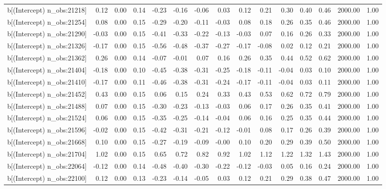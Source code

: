 \begin{table}[ht]
\begin{tabular}{rrrrrrrrrrrrrrr}
  b[(Intercept) n\_obs:21218] & 0.12 & 0.00 & 0.14 & -0.23 & -0.16 & -0.06 & 0.03 & 0.12 & 0.21 & 0.30 & 0.40 & 0.46 & 2000.00 & 1.00 \\ 
  b[(Intercept) n\_obs:21254] & 0.08 & 0.00 & 0.15 & -0.29 & -0.20 & -0.11 & -0.03 & 0.08 & 0.18 & 0.26 & 0.35 & 0.46 & 2000.00 & 1.00 \\ 
  b[(Intercept) n\_obs:21290] & -0.03 & 0.00 & 0.15 & -0.41 & -0.33 & -0.22 & -0.13 & -0.03 & 0.07 & 0.16 & 0.26 & 0.33 & 2000.00 & 1.00 \\ 
  b[(Intercept) n\_obs:21326] & -0.17 & 0.00 & 0.15 & -0.56 & -0.48 & -0.37 & -0.27 & -0.17 & -0.08 & 0.02 & 0.12 & 0.21 & 2000.00 & 1.00 \\ 
  b[(Intercept) n\_obs:21362] & 0.26 & 0.00 & 0.14 & -0.07 & -0.01 & 0.07 & 0.16 & 0.26 & 0.35 & 0.44 & 0.52 & 0.62 & 2000.00 & 1.00 \\ 
  b[(Intercept) n\_obs:21404] & -0.18 & 0.00 & 0.10 & -0.45 & -0.38 & -0.31 & -0.25 & -0.18 & -0.11 & -0.04 & 0.03 & 0.10 & 2000.00 & 1.00 \\ 
  b[(Intercept) n\_obs:21410] & -0.17 & 0.00 & 0.11 & -0.46 & -0.38 & -0.31 & -0.24 & -0.17 & -0.11 & -0.04 & 0.03 & 0.11 & 2000.00 & 1.00 \\ 
  b[(Intercept) n\_obs:21452] & 0.43 & 0.00 & 0.15 & 0.06 & 0.15 & 0.24 & 0.33 & 0.43 & 0.53 & 0.62 & 0.72 & 0.79 & 2000.00 & 1.00 \\ 
  b[(Intercept) n\_obs:21488] & 0.07 & 0.00 & 0.15 & -0.30 & -0.23 & -0.13 & -0.03 & 0.06 & 0.17 & 0.26 & 0.35 & 0.41 & 2000.00 & 1.00 \\ 
  b[(Intercept) n\_obs:21524] & 0.06 & 0.00 & 0.15 & -0.35 & -0.25 & -0.14 & -0.04 & 0.06 & 0.16 & 0.25 & 0.35 & 0.44 & 2000.00 & 1.00 \\ 
  b[(Intercept) n\_obs:21596] & -0.02 & 0.00 & 0.15 & -0.42 & -0.31 & -0.21 & -0.12 & -0.01 & 0.08 & 0.17 & 0.26 & 0.39 & 2000.00 & 1.00 \\ 
  b[(Intercept) n\_obs:21668] & 0.10 & 0.00 & 0.15 & -0.27 & -0.19 & -0.09 & -0.00 & 0.10 & 0.20 & 0.29 & 0.39 & 0.50 & 2000.00 & 1.00 \\ 
  b[(Intercept) n\_obs:21704] & 1.02 & 0.00 & 0.15 & 0.65 & 0.72 & 0.82 & 0.92 & 1.02 & 1.12 & 1.22 & 1.32 & 1.43 & 2000.00 & 1.00 \\ 
  b[(Intercept) n\_obs:22064] & -0.12 & 0.00 & 0.14 & -0.48 & -0.40 & -0.30 & -0.22 & -0.12 & -0.03 & 0.05 & 0.16 & 0.24 & 2000.00 & 1.00 \\ 
  b[(Intercept) n\_obs:22100] & 0.12 & 0.00 & 0.13 & -0.23 & -0.14 & -0.05 & 0.03 & 0.12 & 0.21 & 0.29 & 0.38 & 0.47 & 2000.00 & 1.00 \\ 

\end{tabular}
\end{table}
